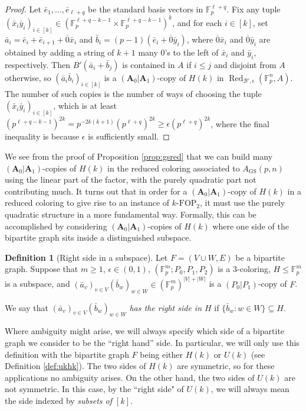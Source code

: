 \documentclass[12pt,oneside,british,a4wide]{amsart}
\numberwithin{equation}{section}
\theoremstyle{definition}
\newtheorem{definition}[theorem]{Definition}
\def\F{\mathbb{F}}
\def\FOP{\mathrm{FOP}}
\def\GS{\mathrm{GS}}
\def\e{\epsilon}
\newcommand{\abar}{\bar{a}}
\newcommand{\bbar}{\bar{b}}
\newcommand{\ebar}{\bar{e}}
\newcommand{\xbar}{\bar{x}}
\newcommand{\ybar}{\bar{y}}
\newcommand{\calB}{\mathcal{B}}
\newcommand{\Red}{{\mathrm{Red}}}
\def\Red{\operatorname{Red}}
\begin{document}
\begin{proof}
Let $\ebar_1,\ldots, \ebar_{\ell+q}$ be the standard basis vectors in $\F_p^{\ell+q}$. Fix any tuple $(\xbar_i\ybar_i)_{i\in [k]}\in (\F_p^{\ell+q-k-1}\times \F_p^{\ell+q-k-1})^{k}$, and for each $i\in [k]$, set $\abar_i=\ebar_i+\ebar_{i+1}+\overline{0}\xbar_i$ and $\bbar_i=(p-1)(\ebar_i+\overline{0}\ybar_i)$, where $\overline{0}\xbar_i$ and $\overline{0}\ybar_i$ are obtained by adding a string of $k+1$ many $0$'s to the left of $\xbar_i$ and $\ybar_i$, respectively.  Then $B'(\abar_i+\bbar_j)$ is contained in $A$ if $i\leq j$ and disjoint from $A$ otherwise, so $(\abar_i\bbar_i)_{i\in [k]}$ is a $(\mathbf{A}_0|\mathbf{A}_1)$-copy of $H(k)$ in $\Red_{\calB',\e}(\F_p^n,A)$.  The number of such copies is the number of ways of choosing the tuple $(\xbar_i\ybar_i)_{i\in [k]}$, which is at least $(p^{\ell+q-k-1})^{2k}=p^{-2k(k+1)}(p^{\ell+q})^{2k}\geq \e (p^{\ell+q})^{2k}$, where the final inequality is because $\e$ is sufficiently small.
\end{proof}


We see from the proof of Proposition \ref{prop:gsred} that we can build many $(\mathbf{A}_0|\mathbf{A}_1)$-copies of $H(k)$ in the reduced coloring associated to $A_{\GS}(p,n)$ using the linear part of the factor, with the purely quadratic part not contributing much.  It turns out that in order for a  $(\mathbf{A}_0|\mathbf{A}_1)$-copy of $H(k)$ in a reduced coloring to give rise to an instance of $k$-$\FOP_2$, it must use the purely quadratic structure in a more fundamental way.  Formally, this can be accomplished by considering  $(\mathbf{A}_0|\mathbf{A}_1)$-copies of $H(k)$ where one side of the bipartite graph sits inside a distinguished subspace.  

\begin{definition}[Right side in a subspace]\label{def:oneside}
Let $F=(V\cup W,E)$ be a bipartite graph.  Suppose that $m\geq 1$, $\e\in (0,1)$, $(\F_p^m; P_0,P_1,P_2)$ is a $3$-coloring,  $H\leqslant \F_p^m$ is a subspace, and $(\abar_v)_{v\in V}(\bbar_w)_{w\in W}\in (\F_p^m)^{|V|+|W|}$ is a $(P_0|P_1)$-copy of $F$.  

We say that $(\abar_v)_{v\in V}(\bbar_w)_{w\in W}$  \emph{has the right side in $H$} if $\{\bbar_w: w\in W\}\subseteq H$.
\end{definition}

Where ambiguity might arise, we will always specify which side of a bipartite graph we consider to be the ``right hand'' side.  In particular, we will only use this definition with the bipartite graph $F$ being either  $H(k)$ or $U(k)$ (see Definition \ref{def:ukhk}).  The two sides of $H(k)$ are symmetric, so for these applications no ambiguity arises.  On the other hand, the two sides of $U(k)$ are not symmetric.  In this case, by the ``right side" of $U(k)$, we  will always mean the side indexed by \emph{subsets of $[k]$}.  
\end{document}
